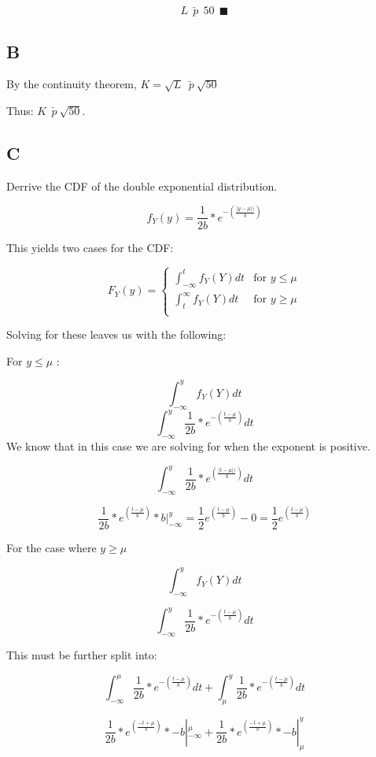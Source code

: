 \documentclass[]{article}
\begin{document}
\[L \ \ \underrightarrow{p} \ \ 50 \ \ \blacksquare\]

\hypertarget{b}{%
\subsection{B}\label{b}}

By the continuity theorem,
\(K = \sqrt{L} \ \ \underrightarrow{p} \ \sqrt{50}\)

Thus: \(K\ \ \underrightarrow{p} \ \sqrt{50}\).

\hypertarget{c}{%
\subsection{C}\label{c}}

Derrive the CDF of the double exponential distribution.

\[f_Y(y) = \frac{1}{2b} * e^{-(\frac{|{y-\mu|)}}{b})}\]

This yields two cases for the CDF:

\[
F_Y(y)=
\begin{cases}
\int_{-\infty}^tf_Y(Y)dt & \text{for } y \le \mu \\
\int^{\infty}_tf_Y(Y)dt & \text{for } y \ge \mu \\
\end{cases}
\]

Solving for these leaves us with the following:

For \(y \le \mu\) :

\[\int_{-\infty}^yf_Y(Y)dt\]
\[\int_{-\infty}^y\frac{1}{2b} * e^{-(\frac{{t-\mu}}{b})}dt\] We know
that in this case we are solving for when the exponent is positive.

\[\int_{-\infty}^y\frac{1}{2b} * e^{(\frac{|{t-\mu|)}}{b})}dt\]

\[\frac{1}{2b} * e^{(\frac{t-\mu}{b})}*b|_{-\infty}^{y}=\frac{1}{2}e^{(\frac{t-\mu}{b})} - 0 = \frac{1}{2}e^{(\frac{t-\mu}{b})}\]

For the case where \(y \ge \mu\)

\[\int_{-\infty}^yf_Y(Y)dt\]

\[\int_{-\infty}^y\frac{1}{2b} * e^{-(\frac{{t-\mu}}{b})}dt\]

This must be further split into:

\[\int_{-\infty}^\mu\frac{1}{2b} * e^{-(\frac{{t-\mu}}{b})}dt + \int_{\mu}^y\frac{1}{2b} * e^{-(\frac{{t-\mu}}{b})}dt\]

\[\frac{1}{2b} * e^{(\frac{-t+\mu}{b})}*-b|_{-\infty}^{\mu} + \frac{1}{2b} * e^{(\frac{-t+\mu}{b})}*-b|_{\mu}^{y}\]
\end{document}
